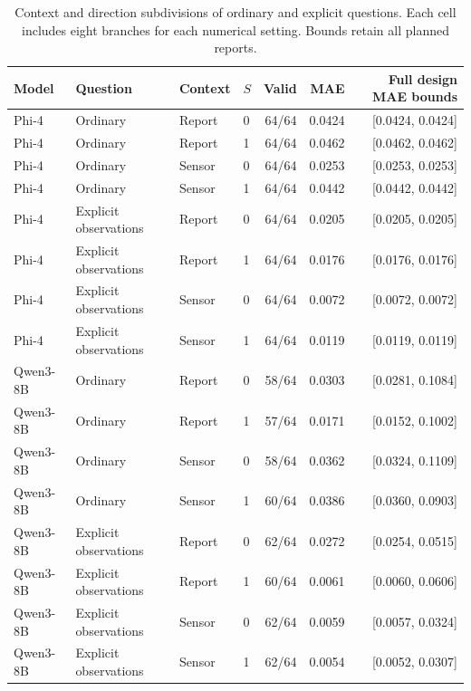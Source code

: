 \begin{table}[t]
\centering
\begin{tabular*}{\textwidth}{@{\extracolsep{\fill}}llllrrr@{}}
\toprule
Model & Question & Context & $S$ & Valid & MAE & Full design MAE bounds \\
\midrule
Phi-4 & Ordinary & Report & 0 & 64/64 & 0.0424 & [0.0424, 0.0424] \\
Phi-4 & Ordinary & Report & 1 & 64/64 & 0.0462 & [0.0462, 0.0462] \\
Phi-4 & Ordinary & Sensor & 0 & 64/64 & 0.0253 & [0.0253, 0.0253] \\
Phi-4 & Ordinary & Sensor & 1 & 64/64 & 0.0442 & [0.0442, 0.0442] \\
Phi-4 & Explicit observations & Report & 0 & 64/64 & 0.0205 & [0.0205, 0.0205] \\
Phi-4 & Explicit observations & Report & 1 & 64/64 & 0.0176 & [0.0176, 0.0176] \\
Phi-4 & Explicit observations & Sensor & 0 & 64/64 & 0.0072 & [0.0072, 0.0072] \\
Phi-4 & Explicit observations & Sensor & 1 & 64/64 & 0.0119 & [0.0119, 0.0119] \\
\midrule
Qwen3-8B & Ordinary & Report & 0 & 58/64 & 0.0303 & [0.0281, 0.1084] \\
Qwen3-8B & Ordinary & Report & 1 & 57/64 & 0.0171 & [0.0152, 0.1002] \\
Qwen3-8B & Ordinary & Sensor & 0 & 58/64 & 0.0362 & [0.0324, 0.1109] \\
Qwen3-8B & Ordinary & Sensor & 1 & 60/64 & 0.0386 & [0.0360, 0.0903] \\
Qwen3-8B & Explicit observations & Report & 0 & 62/64 & 0.0272 & [0.0254, 0.0515] \\
Qwen3-8B & Explicit observations & Report & 1 & 60/64 & 0.0061 & [0.0060, 0.0606] \\
Qwen3-8B & Explicit observations & Sensor & 0 & 62/64 & 0.0059 & [0.0057, 0.0324] \\
Qwen3-8B & Explicit observations & Sensor & 1 & 62/64 & 0.0054 & [0.0052, 0.0307] \\
\bottomrule
\end{tabular*}
\caption{Context and direction subdivisions of ordinary and explicit questions. Each cell includes eight branches for each numerical setting. Bounds retain all planned reports.}
\label{tab:followup-context}
\end{table}
